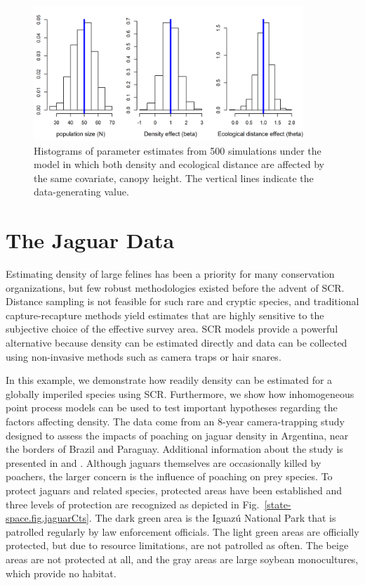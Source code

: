 \begin{figure}[ht]
\centering
\includegraphics[width=4in,height=2in]{Ch11/figs/scrDEDsim}
\caption{Histograms of parameter estimates from 500 simulations under
  the model in which both density and ecological distance are affected
by the same covariate, canopy height. The vertical lines indicate the
data-generating value.}
\label{ch9.fig.sim}
\end{figure}


\section{The Jaguar Data}

Estimating density of large felines has been a priority for many
conservation organizations, but few robust methodologies existed before
the advent of SCR. Distance sampling is not feasible for such rare and
cryptic species, and traditional capture-recapture methods yield
estimates that are highly sensitive to the subjective choice of the
effective survey area. SCR models provide a powerful alternative
because density can be estimated directly and data can be collected
using non-invasive methods such as camera traps or hair snares.

In this example, we demonstrate how readily density can be estimated
for a globally imperiled species using SCR. Furthermore, we show how
inhomogeneous point process models can be used to test important
hypotheses regarding the factors affecting density.
The data come from an 8-year camera-trapping study designed to assess the impacts of poaching
on jaguar density in Argentina, near the borders of Brazil and
Paraguay. Additional information about the study is presented in
\citet{paviolo_etal:2008} and \citet{paviolo_etal:2009}. Although
jaguars themselves are occasionally killed by
poachers, the larger concern is the influence of poaching on prey
species. To protect jaguars and related species, protected areas have
been established and three levels of protection are
recognized as depicted in Fig.~\ref{state-space.fig.jaguarCts}. The dark green
area is the Iguaz\'{u} National Park that is patrolled regularly by law enforcement
officials. The light green areas are officially protected, but due to
resource limitations, are not patrolled as often. The beige areas are
not protected at all, and the gray areas are large soybean
monocultures, which provide no habitat.

